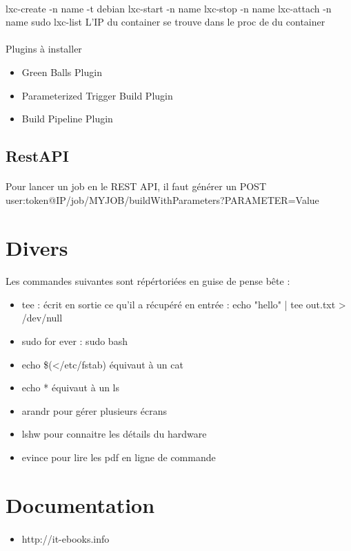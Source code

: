 \documentclass{article}
\begin{document}
\paragraph{}
lxc-create -n name -t debian
lxc-start -n name
lxc-stop -n name
lxc-attach -n name
sudo lxc-list
L'IP du container se trouve dans le proc de du container


\paragraph{}
Plugins à installer
\begin{itemize}
  \item Green Balls Plugin
  \item Parameterized Trigger Build Plugin 
  \item Build Pipeline Plugin
\end{itemize}

\subsection{RestAPI}
\paragraph{}
Pour lancer un job en le REST API, il faut générer un POST user:token@IP/job/MYJOB/buildWithParameters?PARAMETER=Value

\section{Divers}\label{divers}
\paragraph{}
Les commandes suivantes sont répértoriées en guise de pense bête :
\begin{itemize}
  \item tee : écrit en sortie ce qu'il a récupéré en entrée : echo "hello" | tee out.txt > /dev/null
  \item sudo for ever : sudo bash
  \item echo \$(</etc/fstab) équivaut à un cat
  \item echo * équivaut à un ls
  \item arandr pour gérer plusieurs écrans
  \item lshw pour connaitre les détails du hardware
  \item evince pour lire les pdf en ligne de commande
\end{itemize}

\section{Documentation}\label{documentation}
\paragraph{}
\begin{itemize}
  \item http://it-ebooks.info
\end{itemize}
\end{document}
